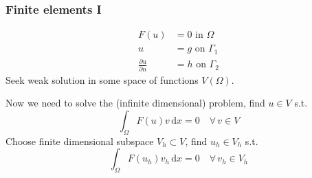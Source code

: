 \documentclass[presentation]{beamer}
\begin{document}
\begin{frame}
  \frametitle{Finite elements I}
  \begin{align*}
    F(u) &= 0 \text{ in $\Omega$}\\
    u &= g \text{ on $\Gamma_1$}\\
    \frac{\partial u}{\partial n} &= h \text{ on $\Gamma_2$}
  \end{align*}
  Seek weak solution in some space of functions $V(\Omega)$.

  Now we need to solve the (infinite dimensional) problem, find $u\in V$ s.t.
  \begin{equation*}
    \int_\Omega \!F(u) v\, \text{d}x = 0 \quad \forall\, v \in V
  \end{equation*}
  Choose finite dimensional subspace $V_h \subset V$, find $u_h \in V_h$ s.t.
  \begin{equation*}
    \int_\Omega \!F(u_h) v_h\, \text{d}x = 0 \quad \forall\, v_h \in V_h
  \end{equation*}
\end{frame}
\end{document}
